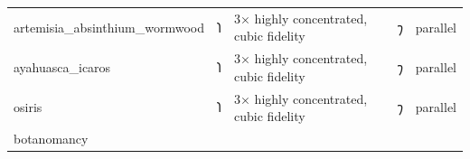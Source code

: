 \documentclass[12pt,a4paper]{article}
\begin{document}
\begin{longtable}[]{@{}lllll@{}}
\begin{minipage}[t]{0.17\columnwidth}
artemisia\_absinthium\_wormwood\strut
\end{minipage} & \begin{minipage}[t]{0.17\columnwidth}\raggedright
𐑐\strut
\end{minipage} & \begin{minipage}[t]{0.17\columnwidth}\raggedright
3× highly concentrated, cubic fidelity\strut
\end{minipage} & \begin{minipage}[t]{0.17\columnwidth}\raggedright
𐑠\strut
\end{minipage} & \begin{minipage}[t]{0.17\columnwidth}\raggedright
parallel\strut
\end{minipage}\tabularnewline
\begin{minipage}[t]{0.17\columnwidth}\raggedright
ayahuasca\_icaros\strut
\end{minipage} & \begin{minipage}[t]{0.17\columnwidth}\raggedright
𐑐\strut
\end{minipage} & \begin{minipage}[t]{0.17\columnwidth}\raggedright
3× highly concentrated, cubic fidelity\strut
\end{minipage} & \begin{minipage}[t]{0.17\columnwidth}\raggedright
𐑠\strut
\end{minipage} & \begin{minipage}[t]{0.17\columnwidth}\raggedright
parallel\strut
\end{minipage}\tabularnewline
\begin{minipage}[t]{0.17\columnwidth}\raggedright
osiris\strut
\end{minipage} & \begin{minipage}[t]{0.17\columnwidth}\raggedright
𐑐\strut
\end{minipage} & \begin{minipage}[t]{0.17\columnwidth}\raggedright
3× highly concentrated, cubic fidelity\strut
\end{minipage} & \begin{minipage}[t]{0.17\columnwidth}\raggedright
𐑠\strut
\end{minipage} & \begin{minipage}[t]{0.17\columnwidth}\raggedright
parallel\strut
\end{minipage}\tabularnewline
\begin{minipage}[t]{0.17\columnwidth}\raggedright
botanomancy\strut
\end{minipage} & \begin{minipage}[t]{0.17\columnwidth}\raggedright

\end{minipage}
\end{longtable}
\end{document}
